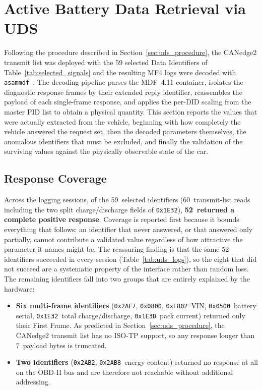 \documentclass[11pt,a4paper,oneside,parskip=half]{scrreprt}
\providecommand{\hex}{}\renewcommand{\hex}[1]{\texttt{0x#1}}
\begin{document}
\section{Active Battery Data Retrieval via UDS}
Following the procedure described in Section~\ref{sec:uds_procedure}, the CANedge2 transmit list was deployed with the 59 selected Data Identifiers of Table~\ref{tab:selected_signals} and the resulting MF4 logs were decoded with \texttt{asammdf}~\cite{asammdf}. The decoding pipeline parses the MDF~4.11 container, isolates the diagnostic response frames by their extended reply identifier, reassembles the payload of each single-frame response, and applies the per-DID scaling from the master PID list to obtain a physical quantity. This section reports the values that were actually extracted from the vehicle, beginning with how completely the vehicle answered the request set, then the decoded parameters themselves, the anomalous identifiers that must be excluded, and finally the validation of the surviving values against the physically observable state of the car.

\subsection{Response Coverage}
Across the logging sessions, of the 59~selected identifiers (60~transmit-list reads including the two split charge/discharge fields of \hex{1E32}), \textbf{52~returned a complete positive response}. Coverage is reported first because it bounds everything that follows: an identifier that never answered, or that answered only partially, cannot contribute a validated value regardless of how attractive the parameter it names might be. The reassuring finding is that the same 52 identifiers succeeded in every session (Table~\ref{tab:uds_logs}), so the eight that did not succeed are a systematic property of the interface rather than random loss. The remaining identifiers fall into two groups that are entirely explained by the hardware:

\begin{itemize}
  \item \textbf{Six multi-frame identifiers} (\hex{2AF7}, \hex{0800}, \hex{F802}~VIN, \hex{0500}~battery serial, \hex{1E32}~total charge/dis\-charge, \hex{1E3D}~pack current) returned only their First Frame. As predicted in Section~\ref{sec:uds_procedure}, the CANedge2 transmit list has no ISO-TP support, so any response longer than 7~payload bytes is truncated.
  \item \textbf{Two identifiers} (\hex{2AB2}, \hex{2AB8}~energy content) returned no response at all on the OBD-II bus and are therefore not reachable without additional addressing.
\end{itemize}
\end{document}

